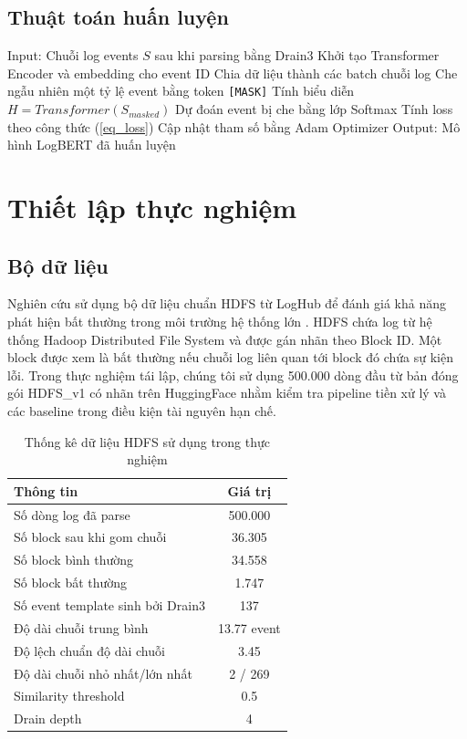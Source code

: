 \documentclass[conference]{IEEEtran}
\begin{document}
\subsection{Thuật toán huấn luyện}
\begin{algorithmic}[1]
\STATE Input: Chuỗi log events $S$ sau khi parsing bằng Drain3
\STATE Khởi tạo Transformer Encoder và embedding cho event ID
    \STATE Chia dữ liệu thành các batch chuỗi log
    \STATE Che ngẫu nhiên một tỷ lệ event bằng token \texttt{[MASK]}
    \STATE Tính biểu diễn $H = Transformer(S_{masked})$
    \STATE Dự đoán event bị che bằng lớp Softmax
    \STATE Tính loss theo công thức (\ref{eq_loss})
    \STATE Cập nhật tham số bằng Adam Optimizer
\ENDFOR
\STATE Output: Mô hình LogBERT đã huấn luyện
\end{algorithmic}

\section{Thiết lập thực nghiệm}
\subsection{Bộ dữ liệu}
Nghiên cứu sử dụng bộ dữ liệu chuẩn HDFS từ LogHub để đánh giá khả năng phát hiện bất thường trong môi trường hệ thống lớn \cite{b6,b12}. HDFS chứa log từ hệ thống Hadoop Distributed File System và được gán nhãn theo Block ID. Một block được xem là bất thường nếu chuỗi log liên quan tới block đó chứa sự kiện lỗi. Trong thực nghiệm tái lập, chúng tôi sử dụng 500.000 dòng đầu từ bản đóng gói HDFS\_v1 có nhãn trên HuggingFace nhằm kiểm tra pipeline tiền xử lý và các baseline trong điều kiện tài nguyên hạn chế.

\begin{table}[!t]
\caption{Thống kê dữ liệu HDFS sử dụng trong thực nghiệm}
\begin{center}
\begin{tabular}{lc}
\toprule
\textbf{Thông tin} & \textbf{Giá trị} \\
\midrule
Số dòng log đã parse & 500.000 \\
Số block sau khi gom chuỗi & 36.305 \\
Số block bình thường & 34.558 \\
Số block bất thường & 1.747 \\
Số event template sinh bởi Drain3 & 137 \\
Độ dài chuỗi trung bình & 13.77 event \\
Độ lệch chuẩn độ dài chuỗi & 3.45 \\
Độ dài chuỗi nhỏ nhất/lớn nhất & 2 / 269 \\
Similarity threshold & 0.5 \\
Drain depth & 4 \\
\bottomrule
\end{tabular}
\label{tab_dataset_stats}
\end{center}
\end{table}
\end{document}
